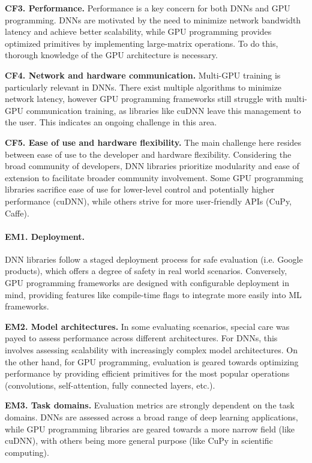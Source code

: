 \textbf{CF3. Performance.}
Performance is a key concern for both DNNs and GPU programming. DNNs are motivated by the need to
minimize network bandwidth latency and achieve better scalability, while GPU programming provides
optimized primitives by implementing large-matrix operations. To do this, thorough
knowledge of the GPU architecture is necessary.

\textbf{CF4. Network and hardware communication.}
Multi-GPU training is particularly relevant in DNNs. There exist multiple algorithms to minimize
network latency, however GPU programming frameworks still struggle with multi-GPU communication
training, as libraries like cuDNN leave this management to the user. This indicates an ongoing
challenge in this area.

\textbf{CF5. Ease of use and hardware flexibility.}
The main challenge here resides between ease of use to the developer and hardware flexibility.
Considering the broad community of developers, DNN libraries prioritize modularity and ease of
extension to facilitate broader community involvement. Some GPU programming libraries sacrifice ease of use for lower-level control
and potentially higher performance (cuDNN), while others strive for more user-friendly APIs (CuPy, Caffe).

\paragraph{EM1. Deployment.}
DNN libraries follow a staged deployment process for safe evaluation (i.e. Google products), which
offers a degree of safety in real world scenarios. Conversely, GPU programming frameworks are
designed with configurable deployment in mind, providing features like compile-time flags to
integrate more easily into ML frameworks.

\textbf{EM2. Model architectures.}
In some evaluating scenarios, special care was payed to assess performance across different architectures.
For DNNs, this involves assessing scalability with increasingly complex model architectures. On the other hand,
for GPU programming, evaluation is geared towards optimizing performance by providing efficient primitives
for the most popular operations (convolutions, self-attention, fully connected layers, etc.).

\textbf{EM3. Task domains.}
Evaluation metrics are strongly dependent on the task domains. DNNs are assessed across
a broad range of deep learning applications, while GPU programming libraries are geared towards
a more narrow field  (like cuDNN), with others being more general purpose (like CuPy in scientific
computing).

